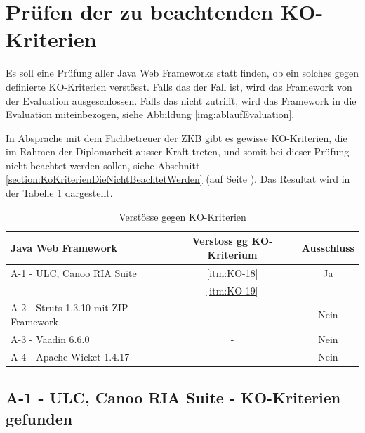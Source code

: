   \section{Prüfen der zu beachtenden KO-Kriterien}
  
  Es soll eine Prüfung aller Java Web Frameworks statt finden, ob ein solches
  gegen definierte KO-Kriterien verstösst. Falls das der Fall ist, wird das
  Framework von der Evaluation ausgeschlossen. Falls das nicht zutrifft, wird
  das Framework in die Evaluation miteinbezogen, siehe Abbildung
  \ref{img:ablaufEvaluation}.
  
  In Absprache mit dem Fachbetreuer der \ac{ZKB} gibt es gewisse KO-Kriterien,
  die im Rahmen der Diplomarbeit ausser Kraft treten, und somit bei dieser
  Prüfung nicht beachtet werden sollen, siehe Abschnitt
  \ref{section:KoKriterienDieNichtBeachtetWerden}
   (auf Seite
  \pageref{section:KoKriterienDieNichtBeachtetWerden}). Das Resultat wird in
  der Tabelle \ref{tab:gefundeneKOKriterien} dargestellt.
  \newline
  
  \begin{table}[!h]
    \sffamily 
    \begin{center}
      \begin{tabular}{lcc}
        \toprule
        \textbf{Java Web Framework} & \textbf{Verstoss gg KO-Kriterium} &
        \textbf{Ausschluss}\\
        \midrule
        A-1 - ULC, Canoo RIA Suite & \ref{itm:KO-18} & Ja\\
        & \ref{itm:KO-19} &\\
        A-2 - Struts 1.3.10 mit ZIP-Framework & - & Nein\\
        A-3 - Vaadin 6.6.0 & - & Nein\\
        A-4 - Apache Wicket 1.4.17 & - & Nein\\
        \bottomrule
      \end{tabular}
      \caption{Verstösse gegen KO-Kriterien}
      \label{tab:gefundeneKOKriterien}
    \end{center}
  \end{table}

  \subsection{A-1 - ULC, Canoo RIA Suite - KO-Kriterien gefunden}
  
